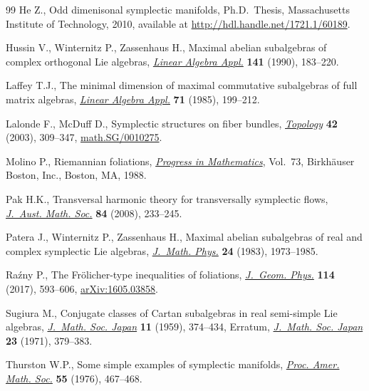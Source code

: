 \documentclass[10pt,a4paper]{amsart}
\numberwithin{equation}{section}
\begin{document}
\begin{thebibliography}{99}
He Z., Odd dimenisonal symplectic manifolds, Ph.D.~Thesis, Massachusetts
 Institute of Technology, 2010, available at \url{http://hdl.handle.net/1721.1/60189}.

Hussin V., Winternitz P., Zassenhaus H., Maximal abelian subalgebras of complex
 orthogonal {L}ie algebras, \href{https://doi.org/10.1016/0024-3795(90)90317-6}{\textit{Linear Algebra Appl.}} \textbf{141} (1990),
 183--220.

Laffey T.J., The minimal dimension of maximal commutative subalgebras of full
 matrix algebras, \href{https://doi.org/10.1016/0024-3795(85)90247-2}{\textit{Linear Algebra Appl.}} \textbf{71} (1985), 199--212.

Lalonde F., McDuff D., Symplectic structures on fiber bundles,
 \href{https://doi.org/10.1016/S0040-9383(01)00020-9}{\textit{Topology}} \textbf{42} (2003), 309--347, \href{https://arxiv.org/abs/math.SG/0010275}{math.SG/0010275}.

Molino P., Riemannian foliations, \href{https://doi.org/10.1007/978-1-4684-8670-4}{\textit{Progress in Mathematics}}, Vol.~73,
 Birkh\"auser Boston, Inc., Boston, MA, 1988.

Pak H.K., Transversal harmonic theory for transversally symplectic flows,
 \href{https://doi.org/10.1017/S1446788708000190}{\textit{J.~Aust. Math. Soc.}} \textbf{84} (2008), 233--245.

Patera J., Winternitz P., Zassenhaus H., Maximal abelian subalgebras of
 real and complex symplectic {L}ie algebras, \href{https://doi.org/10.1063/1.525955}{\textit{J.~Math. Phys.}}
 \textbf{24} (1983), 1973--1985.

Ra\'zny P., The {F}r\"olicher-type inequalities of foliations, \href{https://doi.org/10.1016/j.geomphys.2017.01.005}{\textit{J.~Geom.
 Phys.}} \textbf{114} (2017), 593--606, \href{https://arxiv.org/abs/1605.03858}{arXiv:1605.03858}.

Sugiura M., Conjugate classes of {C}artan subalgebras in real semi-simple {L}ie
 algebras, \href{https://doi.org/10.2969/jmsj/01140374}{\textit{J.~Math. Soc. Japan}} \textbf{11} (1959), 374--434,
 {E}rratum, \href{https://doi.org/10.2969/jmsj/02320379}{\textit{J.~Math. Soc.
 Japan}} {\bf 23} (1971), 379--383.

Thurston W.P., Some simple examples of symplectic manifolds, \href{https://doi.org/10.2307/2041749}{\textit{Proc.
 Amer. Math. Soc.}} \textbf{55} (1976), 467--468.


\end{thebibliography}
\end{document}
